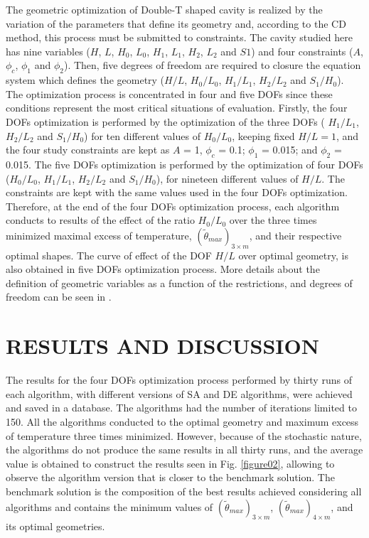 \documentclass[12pt,fleqn]{article}
\begin{document}
The geometric optimization of Double-T shaped cavity is realized by the variation of the parameters that define its geometry and, according to the CD method, this process must be submitted to constraints. The cavity studied here has nine variables ($H$, $L$, $H_{0}$, $L_{0}$, $H_{1}$, $L_{1}$, $H_{2}$, $L_{2}$ and $S1$) and four constraints ($A$, $\phi_{c}$, $\phi_{1}$ and $\phi_{2}$). Then, five degrees of freedom are required to closure the equation system which defines the geometry ($H/L$, $H_{0}/L_{0}$, $H_{1}/L_{1}$, $H_{2}/L_{2}$ and $S_{1}/H_{0}$). The optimization process is concentrated in four and five DOFs since these conditions represent the most critical situations of evaluation. Firstly, the four DOFs optimization is performed by the optimization of the three DOFs ( $H_{1}/L_{1}$, $H_{2}/L_{2}$ and $S_{1}/H_{0}$) for ten different values of $H_{0}/L_{0}$,  keeping fixed  $H/L = 1$, and the four study constraints are kept as $A$ = 1, $\phi_{c}$ = 0.1; $\phi_{1}$ = 0.015; and $\phi_{2}$ = 0.015. The five DOFs optimization is performed by the optimization of four DOFs ($H_{0}/L_{0}$, $H_{1}/L_{1}$, $H_{2}/L_{2}$ and $S_{1}/H_{0}$), for nineteen different values of $H/L$.  The constraints are kept with the same values used in the four  DOFs optimization. Therefore, at the end of the four  DOFs optimization process, each algorithm conducts to results of the effect of the ratio $H_{0}/L_{0}$ over the three times minimized maximal excess of temperature, $(\tilde{\theta}_{max})_{3\times m}$, and their respective optimal shapes. The curve of effect of the DOF $H/L$ over optimal geometry, is also obtained in five DOFs optimization process. More details about the definition of geometric variables as a function of the restrictions, and degrees of freedom can be seen in \cite{Gonzales2015b}.

\section{RESULTS AND DISCUSSION}

The results for the four DOFs optimization process performed by thirty runs of each algorithm, with different versions of SA and DE algorithms, were achieved and saved in a database. The algorithms had the number of iterations limited to 150. All the algorithms conducted to the optimal geometry and maximum excess of temperature three times minimized. However, because of the stochastic nature, the algorithms do not produce the same results in all thirty runs, and the average value is obtained to construct the results seen in Fig. \ref{figure02}, allowing to observe the algorithm version that is closer to the benchmark solution. The benchmark solution is the composition of the best results achieved considering all algorithms and contains the minimum values of $(\tilde{\theta}_{max})_{3\times m}$, $(\tilde{\theta}_{max})_{4\times m}$, and its optimal geometries.
\end{document}
